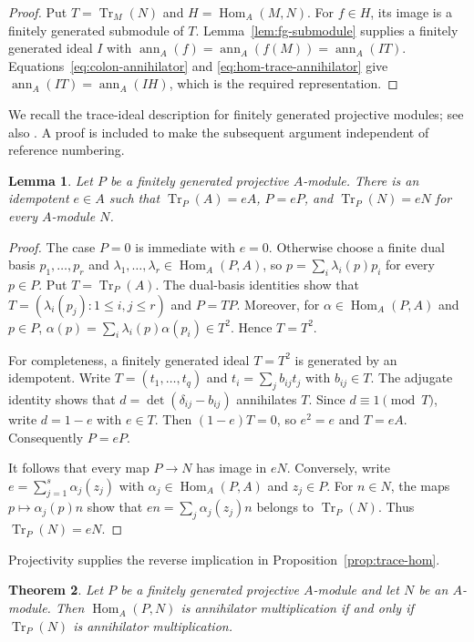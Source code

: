 \documentclass[11pt]{amsart}
\theoremstyle{plain}
\newtheorem{theorem}{Theorem}[section]
\newtheorem{lemma}[theorem]{Lemma}
\theoremstyle{definition}
\theoremstyle{remark}
\DeclareMathOperator{\Hom}{Hom}
\DeclareMathOperator{\Tr}{Tr}
\newcommand{\ann}{\operatorname{ann}}
\numberwithin{equation}{section}
\begin{document}
\begin{proof}
Put $T=\Tr_M(N)$ and $H=\Hom_A(M,N)$. For $f\in H$, its image is a
finitely generated submodule of $T$. Lemma~\ref{lem:fg-submodule} supplies
a finitely generated ideal $I$ with
$\ann_A(f)=\ann_A(f(M))=\ann_A(IT)$.
Equations~\eqref{eq:colon-annihilator} and
\eqref{eq:hom-trace-annihilator} give $\ann_A(IT)=\ann_A(IH)$,
which is the required representation.
\end{proof}

We recall the trace-ideal description for finitely generated projective
modules; see also \cite{Lam99}. A proof is included to make the subsequent
argument independent of reference numbering.

\begin{lemma}\label{lem:projective-trace}
Let $P$ be a finitely generated projective $A$-module. There is an idempotent
$e\in A$ such that $\Tr_P(A)=eA$, $P=eP$, and
$\Tr_P(N)=eN$ for every $A$-module $N$.
\end{lemma}

\begin{proof}
The case $P=0$ is immediate with $e=0$. Otherwise choose a finite dual basis
$p_1,\ldots,p_r$ and $\lambda_1,\ldots,\lambda_r\in\Hom_A(P,A)$, so
$p=\sum_i\lambda_i(p)p_i$ for every $p\in P$.
Put $T=\Tr_P(A)$. The dual-basis identities show that
$T=(\lambda_i(p_j):1\leq i,j\leq r)$ and $P=TP$.
Moreover, for $\alpha\in\Hom_A(P,A)$ and $p\in P$,
$\alpha(p)=\sum_i\lambda_i(p)\alpha(p_i)\in T^2$.
Hence $T=T^2$.

For completeness, a finitely generated ideal $T=T^2$ is generated by an
idempotent. Write $T=(t_1,\ldots,t_q)$ and
$t_i=\sum_j b_{ij}t_j$ with $b_{ij}\in T$.
The adjugate identity shows that $d=\det(\delta_{ij}-b_{ij})$ annihilates
$T$. Since $d\equiv1\pmod T$, write $d=1-e$ with $e\in T$.
Then $(1-e)T=0$, so $e^2=e$ and $T=eA$.
Consequently $P=eP$.

It follows that every map $P\to N$ has image in $eN$.
Conversely, write $e=\sum_{j=1}^s\alpha_j(z_j)$ with
$\alpha_j\in\Hom_A(P,A)$ and $z_j\in P$.
For $n\in N$, the maps $p\mapsto\alpha_j(p)n$ show that
$en=\sum_j\alpha_j(z_j)n$ belongs to $\Tr_P(N)$.
Thus $\Tr_P(N)=eN$.
\end{proof}

Projectivity supplies the reverse implication in
Proposition~\ref{prop:trace-hom}.

\begin{theorem}\label{thm:hom-trace-projective}
Let $P$ be a finitely generated projective $A$-module and let $N$ be an
$A$-module. Then $\Hom_A(P,N)$ is annihilator multiplication if and only if
$\Tr_P(N)$ is annihilator multiplication.
\end{theorem}
\end{document}
